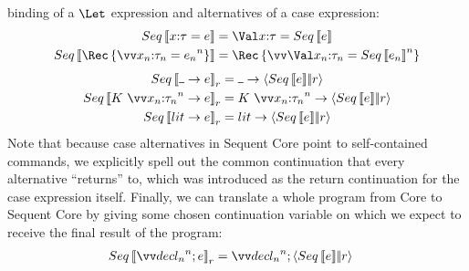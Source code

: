 \documentclass{article}
\begin{document}
binding of a $\Let$ expression and alternatives of a case expression:
\begin{align*}
  Seq\trans{\nonrec{\ann x \ty = \expr}}
  &=
  \nonrec{\bindv{\ann x \ty}{Seq\trans{\expr}}}
  \\
  Seq\trans{\rec{\vect[n]{\ann{x_n}{\ty_n} = \expr_n}}}
  &=
  \rec{\vect[n]{\bindv{\ann{x_n}{\ty_n}}{Seq\trans{\expr_n}}}}
\end{align*}
\begin{align*}
  Seq\trans{\blank \to \expr}_{r}
  &=
  \blank \to \cut{Seq\trans{\expr}}{r}
  \\
  Seq\trans{
    K ~ \vect[n]{\ann{x_n}{\ty_n}} \to \expr
  }_{r}
  &=
  K ~ \vect[n]{\ann{x_n}{\ty_n}}
  \to
  \cut{Seq\trans{\expr}}{r}
  \\
  Seq\trans{\lit \to \expr}_{r}
  &=
  \lit \to \cut{Seq\trans{\expr}}{r}
\end{align*}
Note that because case alternatives in Sequent Core point to self-contained
commands, we explicitly spell out the common continuation that every alternative
``returns'' to, which was introduced as the return continuation for the case
expression itself.  Finally, we can translate a whole program from Core to
Sequent Core by giving some chosen continuation variable on which we expect to
receive the final result of the program:
\begin{align*}
  Seq\trans{\vect[n]{\decl_n}; e}_{r}
  &=
  \vect[n]{\decl_n}; \cut{Seq\trans{e}}{r}
\end{align*}
\end{document}
